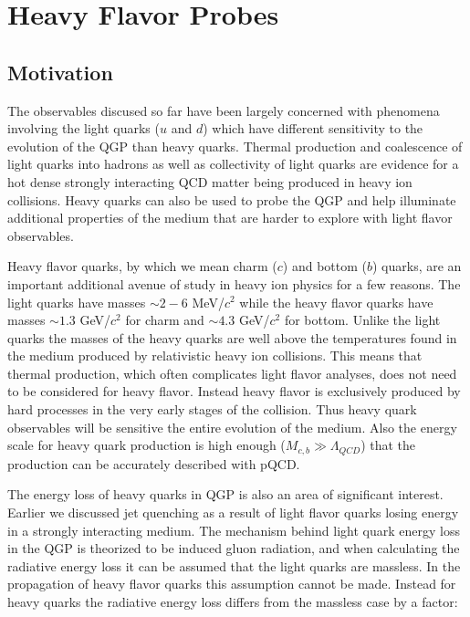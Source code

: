 \section{Heavy Flavor Probes}

\subsection{Motivation}

The observables discused so far have been largely concerned with phenomena involving the light quarks ($u$ and $d$) which have different sensitivity to the evolution of the QGP than heavy quarks. Thermal production and coalescence of light quarks into hadrons as well as collectivity of light quarks are evidence for a hot dense strongly interacting QCD matter being produced in heavy ion collisions. Heavy quarks can also be used to probe the QGP and help illuminate additional properties of the medium that are harder to explore with light flavor observables. 

Heavy flavor quarks, by which we mean charm ($c$) and bottom ($b$) quarks, are an important additional avenue of study in heavy ion physics for a few reasons. The light quarks have masses $\sim2-6$ MeV/$c^2$ while the heavy flavor quarks have masses $\sim1.3$ GeV/$c^2$ for charm and $\sim4.3$ GeV/$c^2$ for bottom. Unlike the light quarks the masses of the heavy quarks are well above the temperatures found in the medium produced by relativistic heavy ion collisions. This means that thermal production, which often complicates light flavor analyses, does not need to be considered for heavy flavor. Instead heavy flavor is exclusively produced by hard processes in the very early stages of the collision. Thus heavy quark observables will be sensitive the entire evolution of the medium. Also the energy scale for heavy quark production is high enough ($M_{c,b} \gg \Lambda_{QCD}$) that the production can be accurately described with pQCD.

The energy loss of heavy quarks in QGP is also an area of significant interest. Earlier we discussed jet quenching as a result of light flavor quarks losing energy in a strongly interacting medium. The mechanism behind light quark energy loss in the QGP is theorized to be induced gluon radiation, and when calculating the radiative energy loss it can be assumed that the light quarks are massless. In the propagation of heavy flavor quarks this assumption cannot be made. Instead for heavy quarks the radiative energy loss differs from the massless case by a factor:

